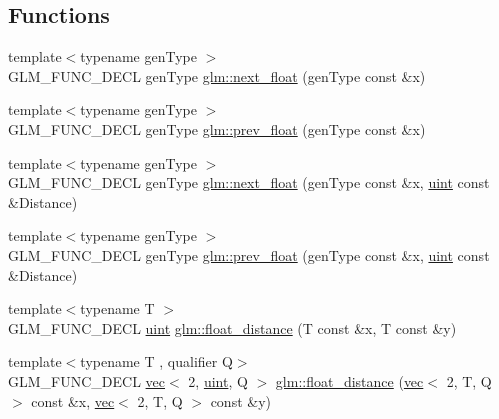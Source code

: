 \subsection*{Functions}
\begin{DoxyCompactItemize}
\item 
{\footnotesize template$<$typename gen\+Type $>$ }\\G\+L\+M\+\_\+\+F\+U\+N\+C\+\_\+\+D\+E\+CL gen\+Type \hyperlink{group__gtc__ulp_gae516ae554faa6117660828240e8bdaf0}{glm\+::next\+\_\+float} (gen\+Type const \&x)
\item 
{\footnotesize template$<$typename gen\+Type $>$ }\\G\+L\+M\+\_\+\+F\+U\+N\+C\+\_\+\+D\+E\+CL gen\+Type \hyperlink{group__gtc__ulp_ga2fcbb7bfbfc595712bfddc51b0715b07}{glm\+::prev\+\_\+float} (gen\+Type const \&x)
\item 
{\footnotesize template$<$typename gen\+Type $>$ }\\G\+L\+M\+\_\+\+F\+U\+N\+C\+\_\+\+D\+E\+CL gen\+Type \hyperlink{group__gtc__ulp_gad107ec3d9697ef82032a33338a73ebdd}{glm\+::next\+\_\+float} (gen\+Type const \&x, \hyperlink{group__core__precision_ga4fd29415871152bfb5abd588334147c8}{uint} const \&Distance)
\item 
{\footnotesize template$<$typename gen\+Type $>$ }\\G\+L\+M\+\_\+\+F\+U\+N\+C\+\_\+\+D\+E\+CL gen\+Type \hyperlink{group__gtc__ulp_gaa399d5b6472a70e8952f9b26ecaacdec}{glm\+::prev\+\_\+float} (gen\+Type const \&x, \hyperlink{group__core__precision_ga4fd29415871152bfb5abd588334147c8}{uint} const \&Distance)
\item 
{\footnotesize template$<$typename T $>$ }\\G\+L\+M\+\_\+\+F\+U\+N\+C\+\_\+\+D\+E\+CL \hyperlink{group__core__precision_ga4fd29415871152bfb5abd588334147c8}{uint} \hyperlink{group__gtc__ulp_ga2e09bd6c8b0a9c91f6f5683d68245634}{glm\+::float\+\_\+distance} (T const \&x, T const \&y)
\item 
{\footnotesize template$<$typename T , qualifier Q$>$ }\\G\+L\+M\+\_\+\+F\+U\+N\+C\+\_\+\+D\+E\+CL \hyperlink{structglm_1_1vec}{vec}$<$ 2, \hyperlink{group__core__precision_ga4fd29415871152bfb5abd588334147c8}{uint}, Q $>$ \hyperlink{group__gtc__ulp_ga72b3223069013f336d8c31812b7ada80}{glm\+::float\+\_\+distance} (\hyperlink{structglm_1_1vec}{vec}$<$ 2, T, Q $>$ const \&x, \hyperlink{structglm_1_1vec}{vec}$<$ 2, T, Q $>$ const \&y)
\end{DoxyCompactItemize}


